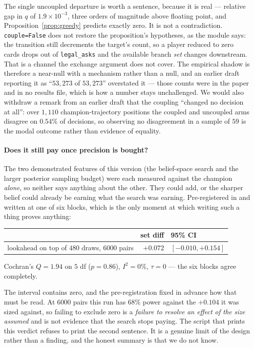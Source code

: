 \documentclass[11pt,letterpaper]{article}
\begin{document}
The single uncoupled departure is worth a sentence, because it is real ---
relative gap in $q$ of $1.9\times 10^{-3}$, three orders of magnitude above
floating point, and Proposition~\ref{prop:greedy} predicts exactly zero. It
is not a contradiction. \texttt{couple=False} does not restore the
proposition's hypotheses, as the module says: the transition still decrements
the target's count, so a player reduced to zero cards drops out of
\texttt{legal\_asks} and the available branch \emph{set} changes downstream.
That is a channel the exchange argument does not cover. The empirical shadow is
therefore a near-null with a mechanism rather than a null, and an earlier draft
reporting it as ``$53{,}273$ of $53{,}273$'' overstated it --- those counts were
in the paper and in no results file, which is how a number stays unchallenged. We would also withdraw a remark from an earlier draft that the
coupling ``changed no decision at all'': over $1{,}110$ champion-trajectory
positions the coupled and uncoupled arms disagree on $0.54\%$ of decisions, so
observing no disagreement in a sample of $59$ is the modal outcome rather than
evidence of equality.

\paragraph{Does it still pay once precision is bought?} The two demonstrated
features of this version (the belief-space search and the larger posterior
sampling budget) were each measured against the champion \emph{alone}, so
neither says anything about the other. They could add, or the sharper belief
could already be earning what the search was earning. Pre-registered in
 and written at one of six blocks, which
is the only moment at which writing such a thing proves anything:
\begin{center}
\begin{tabular}{lrl}
\toprule
& set diff & 95\% CI \\
\midrule
lookahead on top of $480$ draws, $6000$ pairs & $+0.072$ & $[-0.010, +0.154]$ \\
\bottomrule
\end{tabular}
\end{center}
Cochran's $Q = 1.94$ on $5$ df ($p = 0.86$), $I^2 = 0\%$, $\tau = 0$ --- the six
blocks agree completely.

The interval contains zero, and the pre-registration fixed in advance how that
must be read. At $6000$ pairs this run has $68\%$ power against the $+0.104$ it
was sized against, so failing to exclude zero is a \emph{failure to resolve an
effect of the size assumed} and is not evidence that the search stops paying.
The script that prints this verdict refuses to print the second sentence. It is
a genuine limit of the design rather than a finding, and the honest summary is
that we do not know.
\end{document}

